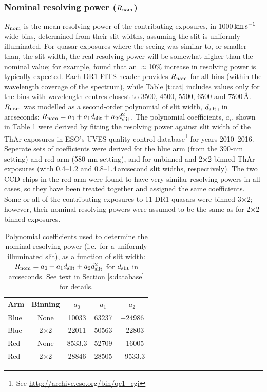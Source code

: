 \documentclass[fleqn,usenatbib,usedcolumn]{mnras}
\newcommand{\Sref}[1]{Section \ref{#1}}
\newcommand{\Tref}[1]{Table \ref{#1}}
\newcommand{\kms}{\ensuremath{\textrm{km\,s}^{-1}}}
\begin{document}
\subsubsection{Nominal resolving power ($R_{\rm nom}$)}\label{sss:Rnom}

$R_{\rm nom}$ is the mean resolving power of the contributing exposures, in 1000\,\kms-wide bins, determined from their slit widths, assuming the slit is uniformly illuminated. For quasar exposures where the seeing was similar to, or smaller than, the slit width, the real resolving power will be somewhat higher than the nominal value; for example, \citet{Kotus:2017:3679} found that an $\approx$10\% increase in resolving power is typically expected. Each DR1 FITS header provides $R_{\rm nom}$ for all bins (within the wavelength coverage of the spectrum), while \Tref{t:cat} includes values only for the bins with wavelength centres closest to 3500, 4500, 5500, 6500 and 7500\,\AA. $R_{\rm nom}$ was modelled as a second-order polynomial of slit width, $d_{\rm slit}$, in arcseconds: $R_{\rm nom}=a_0+a_1d_{\rm slit}+a_2d_{\rm slit}^2$. The polynomial coefficients, $a_i$, shown in \Tref{t:nom_resol} were derived by fitting the resolving power against slit width of the ThAr exposures in ESO's UVES quality control database\footnote{See \url{http://archive.eso.org/bin/qc1_cgi}} for years 2010--2016. Seperate sets of coefficients were derived for the blue arm (from the 390-nm setting) and red arm (580-nm setting), and for unbinned and 2$\times$2-binned ThAr exposures (with 0.4--1.2 and 0.8--1.4\,arcsecond slit widths, respectively). The two CCD chips in the red arm were found to have very similar resolving powers in all cases, so they have been treated together and assigned the same coefficients. Some or all of the contributing exposures to 11 DR1 quasars were binned 3$\times$2; however, their nominal resolving powers were assumed to be the same as for 2$\times$2-binned exposures.

\begin{table}
\caption{Polynomial coefficients used to determine the nominal resolving power (i.e.\ for a uniformly illuminated slit), as a function of slit width: $R_{\rm nom}=a_0+a_1d_{\rm slit}+a_2d_{\rm slit}^2$ for $d_{\rm slit}$ in arcseconds. See text in \Sref{s:database} for details.}
\begin{center}
\label{t:nom_resol}
\begin{tabular}{lcccc}
\hline
 \multicolumn{1}{c}{Arm} & Binning    & $a_0$  & $a_1$ & $a_2$   \\
\hline
 Blue                    & None       & 10033  & 63237 & $-$24986  \\
 Blue                    & 2$\times$2 & 22011  & 50563 & $-$22803  \\
 Red                     & None       & 8533.3 & 52709 & $-$16005  \\
 Red                     & 2$\times$2 & 28846  & 28505 & $-$9533.3 \\
\hline
\end{tabular}
\end{center}
\end{table}
\end{document}
